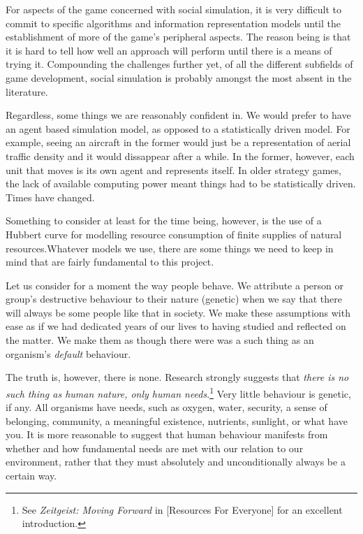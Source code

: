 For aspects of the game concerned with social simulation, it is very difficult to commit to specific algorithms and information representation models until the establishment of more of the game's peripheral aspects. The reason being is that it is hard to tell how well an approach will perform until there is a means of trying it. Compounding the challenges further yet, of all the different subfields of game development, social simulation is probably amongst the most absent in the literature.

Regardless, some things we are reasonably confident in. We would prefer to have an agent based simulation model, as opposed to a statistically driven model. For example, seeing an aircraft in the former would just be a representation of aerial traffic density and it would dissappear after a while. In the former, however, each unit that moves is its own agent and represents itself. In older strategy games, the lack of available computing power meant things had to be statistically driven. Times have changed.

Something to consider at least for the time being, however, is the use of a Hubbert curve for modelling resource consumption of finite supplies of natural resources. Whatever models we use, there are some things we need to keep in mind that are fairly fundamental to this project. 

Let us consider for a moment the way people behave. We attribute a person or group's destructive behaviour to their nature (genetic) when we say that there will always be some people like that in society. We make these assumptions with ease as if we had dedicated years of our lives to having studied and reflected on the matter. We make them as though there were was a such thing as an organism's {\it default} behaviour.

The truth is, however, there is none. Research strongly suggests that {\it there is no such thing as human nature, only human needs}.\footnote{See {\it Zeitgeist: Moving Forward} in [Resources For Everyone] for an excellent introduction.} Very little behaviour is genetic, if any. All organisms have needs, such as oxygen, water, security, a sense of belonging, community, a meaningful existence, nutrients, sunlight, or what have you. It is more reasonable to suggest that human behaviour manifests from whether and how fundamental needs are met with our relation to our environment, rather that they must absolutely and unconditionally always be a certain way.

